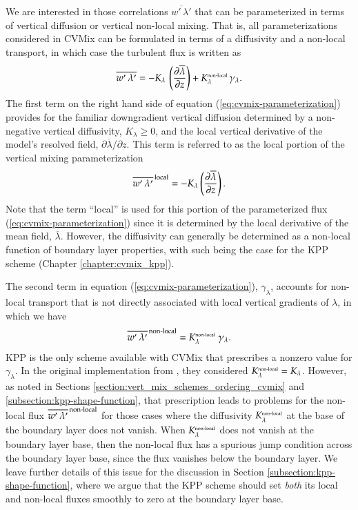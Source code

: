 We are interested in those correlations $\overline{w' \, \lambda'}$
that can be parameterized in terms of vertical diffusion or vertical
non-local mixing.  That is, all parameterizations considered in CVMix
can be formulated in terms of a diffusivity and a non-local transport,
in which case the turbulent flux is written as
\begin{equation}
  \overline{w' \, \lambda'} = 
  -K_{\lambda} \,  \left(  \frac{\partial \overline{\lambda}}{\partial z} \right)
 + K^{\mbox{\tiny non-local}}_{\lambda} \,  \gamma_{\lambda}.
\label{eq:cvmix-parameterization}
\end{equation}
The first term on the right hand side of equation
(\ref{eq:cvmix-parameterization}) provides for the familiar
downgradient vertical diffusion determined by a non-negative vertical
diffusivity, $K_{\lambda} \ge 0$, and the local vertical derivative of
the model's resolved field, $\partial \overline{\lambda} / \partial
z$.  This term is referred to as the local portion of the vertical
mixing parameterization
\begin{equation}
\overline{ w' \, \lambda' }^{\, \mbox{\scriptsize local}} = -K_{\lambda} \left( \frac{\partial \overline{\lambda}}{\partial z} \right).
\end{equation}
Note that the term ``local'' is used for this portion of the
parameterized flux (\ref{eq:cvmix-parameterization}) since it is
determined by the local derivative of the mean field,
$\overline{\lambda}$.  However, the diffusivity can generally be
determined as a non-local function of boundary layer properties, with
such being the case for the KPP scheme (Chapter
\ref{chapter:cvmix_kpp}).  

The second term in equation (\ref{eq:cvmix-parameterization}),
$\gamma_{\lambda}$, accounts for non-local transport that is not
directly associated with local vertical gradients of $\lambda$, in
which we have
\begin{equation}
\overline{w' \, \lambda'}^{\, \mbox{\scriptsize non-local}} = K^{\mbox{\tiny non-local}}_{\lambda}  \; \gamma_{\lambda}.
\label{eq:non-local-transport-intro}
\end{equation}
KPP is the only scheme available with CVMix that prescribes a nonzero
value for $\gamma_{\lambda}$.  In the original implementation from
\cite{LargeKPP}, they considered $K^{\mbox{\tiny non-local}}_{\lambda}
= K_{\lambda}$. However, as noted in Sections
\ref{section:vert_mix_schemes_ordering_cvmix} and
\ref{subsection:kpp-shape-function}, that prescription leads to
problems for the non-local flux $\overline{w' \, \lambda'}^{\,
  \mbox{\scriptsize non-local}}$ for those cases where the diffusivity
$K^{\mbox{\tiny non-local}}_{\lambda}$ at the base of the boundary
layer does not vanish.  When $K^{\mbox{\tiny non-local}}_{\lambda}$
does not vanish at the boundary layer base, then the non-local flux
has a spurious jump condition across the boundary layer base, since
the flux vanishes below the boundary layer. We leave further details
of this issue for the discussion in Section
\ref{subsection:kpp-shape-function}, where we argue that the KPP
scheme should set {\it both} its local and non-local fluxes smoothly
to zero at the boundary layer base.

